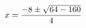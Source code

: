 \documentclass[preview]{standalone}
\begin{document}
\begin{align*}
\special{dvisvgm:raw <g id='unique000'>}x=\frac{-8\pm\sqrt{64-160}}{4}\special{dvisvgm:raw </g>}
\end{align*}
\end{document}
